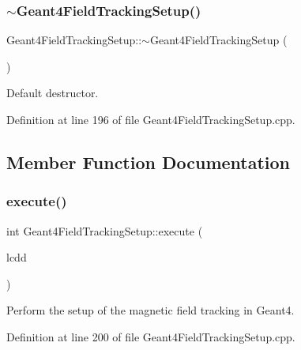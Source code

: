 \subsubsection{\texorpdfstring{$\sim$\+Geant4\+Field\+Tracking\+Setup()}{~Geant4FieldTrackingSetup()}}
{\footnotesize\ttfamily Geant4\+Field\+Tracking\+Setup\+::$\sim$\+Geant4\+Field\+Tracking\+Setup (\begin{DoxyParamCaption}{ }\end{DoxyParamCaption})\hspace{0.3cm}{\ttfamily [virtual]}}



Default destructor. 



Definition at line 196 of file Geant4\+Field\+Tracking\+Setup.\+cpp.



\subsection{Member Function Documentation}
\hypertarget{struct_d_d4hep_1_1_simulation_1_1_geant4_field_tracking_setup_a357240d7fa878959f164ab2050598b8e}{}\label{struct_d_d4hep_1_1_simulation_1_1_geant4_field_tracking_setup_a357240d7fa878959f164ab2050598b8e} 
\subsubsection{\texorpdfstring{execute()}{execute()}}
{\footnotesize\ttfamily int Geant4\+Field\+Tracking\+Setup\+::execute (\begin{DoxyParamCaption}\item[{\hyperlink{class_d_d4hep_1_1_geometry_1_1_l_c_d_d}{Geometry\+::\+L\+C\+DD} \&}]{lcdd }\end{DoxyParamCaption})\hspace{0.3cm}{\ttfamily [virtual]}}



Perform the setup of the magnetic field tracking in Geant4. 



Definition at line 200 of file Geant4\+Field\+Tracking\+Setup.\+cpp.



